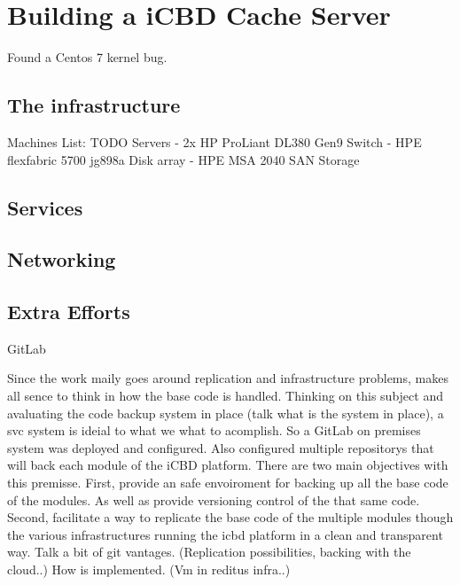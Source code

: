 \section{Building a iCBD Cache Server}
\label{sec:cache_server}

Found a Centos 7 kernel bug.


\subsection{The infrastructure}
\label{sub:infrastructure}

Machines List:
TODO
Servers - 2x HP ProLiant DL380 Gen9
Switch - HPE flexfabric 5700 jg898a
Disk array - HPE MSA 2040 SAN Storage

\subsection{Services}
\label{sub:cache_services}


\subsection{Networking}
\label{sub:cache_networking}

\subsection{Extra Efforts}
\label{sub:extra_efforts}


GitLab

Since the work maily goes around replication and infrastructure problems, makes all sence to think in how the base code is handled. Thinking on this subject and avaluating the code backup system in place (talk what is the system in place), a svc system is ideial to what we what to acomplish.
So a GitLab on premises system was deployed and configured. Also configured multiple repositorys that will back each module of the iCBD platform.
There are two main objectives with this premisse.
First, provide an safe envoiroment for backing up all the base code of the modules. As well as provide versioning control of the that same code.
Second, facilitate a way to replicate the base code of the multiple modules though the various infrastructures running the icbd platform in a clean and transparent way.
Talk a bit of git vantages. (Replication possibilities, backing with the cloud..)
How is implemented. (Vm in reditus infra..)



